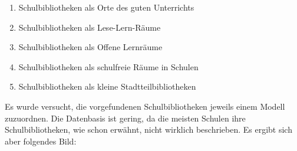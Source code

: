 \documentclass[a4paper,
fontsize=11pt,
oneside,
numbers=noperiodatend,
parskip=half-,
bibliography=totoc,
final
]{scrartcl}
\begin{document}
\begin{enumerate}
\def\labelenumi{\arabic{enumi}.}
\item
  Schulbibliotheken als Orte des guten Unterrichts
\item
  Schulbibliotheken als Lese-Lern-Räume
\item
  Schulbibliotheken als Offene Lernräume
\item
  Schulbibliotheken als schulfreie Räume in Schulen
\item
  Schulbibliotheken als kleine Stadtteilbibliotheken
\end{enumerate}

Es wurde versucht, die vorgefundenen Schulbibliotheken jeweils einem
Modell zuzuordnen. Die Datenbasis ist gering, da die meisten Schulen
ihre Schulbibliotheken, wie schon erwähnt, nicht wirklich beschrieben.
Es ergibt sich aber folgendes Bild:
\end{document}

